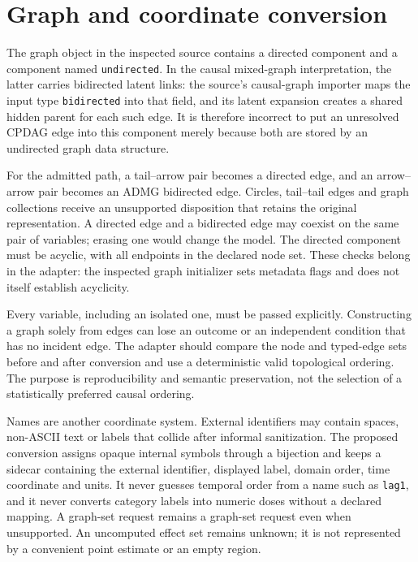 \hypertarget{graph-and-coordinate-conversion}{%
\section{Graph and coordinate
conversion}\label{graph-and-coordinate-conversion}}

The graph object in the inspected source contains a directed component
and a component named \texttt{undirected}. In the causal mixed-graph
interpretation, the latter carries bidirected latent links: the source's
causal-graph importer maps the input type \texttt{bidirected} into that
field, and its latent expansion creates a shared hidden parent for each
such edge. It is therefore incorrect to put an unresolved CPDAG edge
into this component merely because both are stored by an undirected
graph data structure. \citep{exec13_y0_graph}

For the admitted path, a tail--arrow pair becomes a directed edge, and
an arrow--arrow pair becomes an ADMG bidirected edge. Circles,
tail--tail edges and graph collections receive an unsupported
disposition that retains the original representation. A directed edge
and a bidirected edge may coexist on the same pair of variables; erasing
one would change the model. The directed component must be acyclic, with
all endpoints in the declared node set. These checks belong in the
adapter: the inspected graph initializer sets metadata flags and does
not itself establish acyclicity.

Every variable, including an isolated one, must be passed explicitly.
Constructing a graph solely from edges can lose an outcome or an
independent condition that has no incident edge. The adapter should
compare the node and typed-edge sets before and after conversion and use
a deterministic valid topological ordering. The purpose is
reproducibility and semantic preservation, not the selection of a
statistically preferred causal ordering.

Names are another coordinate system. External identifiers may contain
spaces, non-ASCII text or labels that collide after informal
sanitization. The proposed conversion assigns opaque internal symbols
through a bijection and keeps a sidecar containing the external
identifier, displayed label, domain order, time coordinate and units. It
never guesses temporal order from a name such as \texttt{lag1}, and it
never converts category labels into numeric doses without a declared
mapping. A graph-set request remains a graph-set request even when
unsupported. An uncomputed effect set remains unknown; it is not
represented by a convenient point estimate or an empty region.

